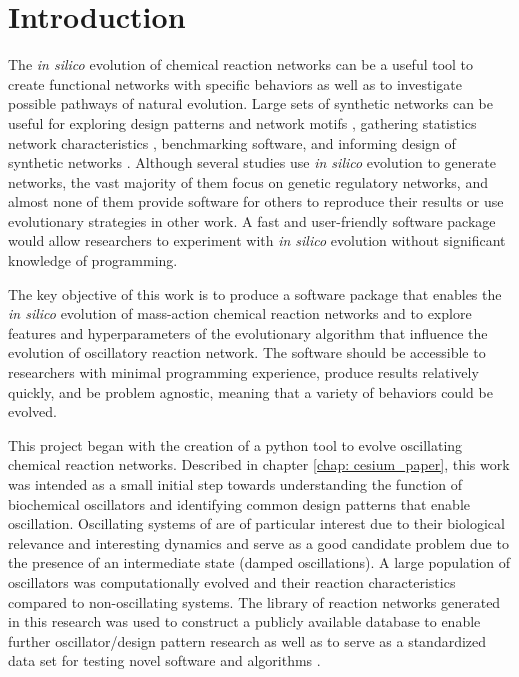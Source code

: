 \documentclass[12pt]{report}
\begin{document}
\chapter{Introduction}
The \textit{in silico} evolution of chemical reaction networks can be a useful tool to create functional networks with specific behaviors as well as to investigate possible pathways of natural evolution. Large sets of synthetic networks can be useful for exploring design patterns and network motifs \cite{Novak2008, Alon2007, jin_evolving_2008} , gathering statistics network characteristics \cite{Tatka2023, deckard2009}, benchmarking software, and informing design of synthetic networks \cite{smith_designing_2017}. Although several studies use \textit{in silico} evolution to generate networks, the vast majority of them focus on genetic regulatory networks, and almost none of them provide software for others to reproduce their results or use evolutionary strategies in other work. A fast and user-friendly software package would allow researchers to experiment with \textit{in silico} evolution without significant knowledge of programming. 

The key objective of this work is to produce a software package that enables the \textit{in silico} evolution of mass-action chemical reaction networks and to explore features and hyperparameters of the evolutionary algorithm that influence the evolution of oscillatory reaction network. The software should be accessible to researchers with minimal programming experience, produce results relatively quickly, and be problem agnostic, meaning that a variety of behaviors could be evolved.  

This project began with the creation of a python tool to evolve oscillating chemical reaction networks. Described in chapter \ref{chap: cesium_paper}, this work was intended as a small initial step towards understanding the function of biochemical oscillators and identifying common design patterns that enable oscillation. Oscillating systems of are of particular interest due to their biological relevance and interesting dynamics and serve as a good candidate problem due to the presence of an intermediate state (damped oscillations). A large population of oscillators was computationally evolved and their reaction characteristics compared to non-oscillating systems. The library of reaction networks generated in this research was used to construct a publicly available database to enable further oscillator/design pattern research as well as to serve as a standardized data set for testing novel software and algorithms \cite{Tatka2023}. 
\end{document}
